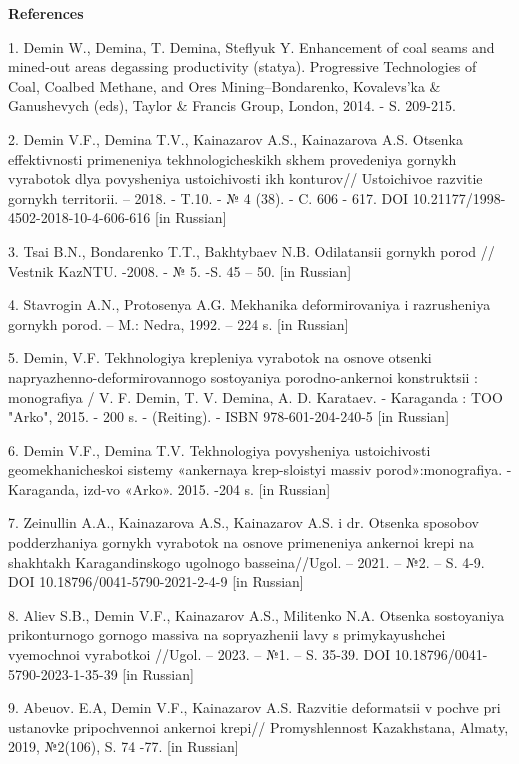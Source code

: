 {\bfseries References}

1. Demin W., Demina, T. Demina, Steflyuk Y. Enhancement of coal seams
and mined-out areas degassing productivity (stat\textquotesingle ya).
Progressive Technologies of Coal, Coalbed Methane, and Ores
Mining--Bondarenko, Kovalevs'ka \& Ganushevych (eds), Taylor \& Francis
Group, London, 2014. - S. 209-215.

2. Demin V.F., Demina T.V., Kainazarov A.S., Kainazarova A.S. Otsenka
effektivnosti primeneniya tekhnologicheskikh skhem provedeniya gornykh
vyrabotok dlya povysheniya ustoichivosti ikh konturov// Ustoichivoe
razvitie gornykh territorii. -- 2018. - T.10. - № 4 (38). - C. 606 -
617. DOI 10.21177/1998-4502-2018-10-4-606-616 {[}in Russian{]}

3. Tsai B.N., Bondarenko T.T., Bakhtybaev N.B. Odilatansii gornykh porod
// Vestnik KazNTU. -2008. - № 5. -S. 45 -- 50. {[}in Russian{]}

4. Stavrogin A.N., Protosenya A.G. Mekhanika deformirovaniya i
razrusheniya gornykh porod. -- M.: Nedra, 1992. -- 224 s. {[}in
Russian{]}

5. Demin, V.F. Tekhnologiya krepleniya vyrabotok na osnove otsenki
napryazhenno-deformirovannogo sostoyaniya porodno-ankernoi konstruktsii
: monografiya / V. F. Demin, T. V. Demina, A. D. Karataev. - Karaganda :
TOO "Arko", 2015. - 200 s. - (Reiting). - ISBN 978-601-204-240-5 {[}in
Russian{]}

6. Demin V.F., Demina T.V. Tekhnologiya povysheniya ustoichivosti
geomekhanicheskoi sistemy «ankernaya krep\textquotesingle-sloistyi
massiv porod»:monografiya. -Karaganda, izd-vo «Arko». 2015. -204 s.
{[}in Russian{]}

7. Zeinullin A.A., Kainazarova A.S., Kainazarov A.S. i dr. Otsenka
sposobov podderzhaniya gornykh vyrabotok na osnove primeneniya ankernoi
krepi na shakhtakh Karagandinskogo ugol\textquotesingle nogo
basseina//Ugol\textquotesingle. -- 2021. -- №2. -- S. 4-9. DOI
10.18796/0041-5790-2021-2-4-9 {[}in Russian{]}

8. Aliev S.B., Demin V.F., Kainazarov A.S., Militenko N.A. Otsenka
sostoyaniya prikonturnogo gornogo massiva na sopryazhenii lavy s
primykayushchei vyemochnoi vyrabotkoi //Ugol\textquotesingle. -- 2023.
-- №1. -- S. 35-39. DOI 10.18796/0041-5790-2023-1-35-39 {[}in Russian{]}

9. Abeuov. E.A, Demin V.F., Kainazarov A.S. Razvitie deformatsii v
pochve pri ustanovke pripochvennoi ankernoi krepi//
Promyshlennost\textquotesingle{} Kazakhstana, Almaty, 2019, №2(106), S.
74 -77. {[}in Russian{]}

